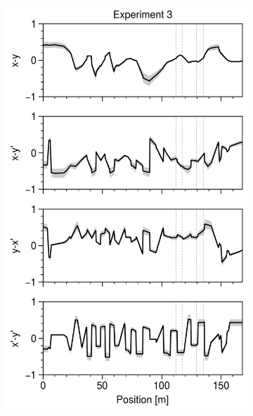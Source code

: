 \begin{figure}[!p]
    \centering
    \vspace*{3.0cm}
    \begin{subfigure}{0.32\textwidth}
        \includegraphics[width=\textwidth]{Images/chapter5/exp3/compare_corr.png}
    \end{subfigure}
    \hfill
    \begin{subfigure}{0.32\textwidth}

\end{subfigure}
\end{figure}
